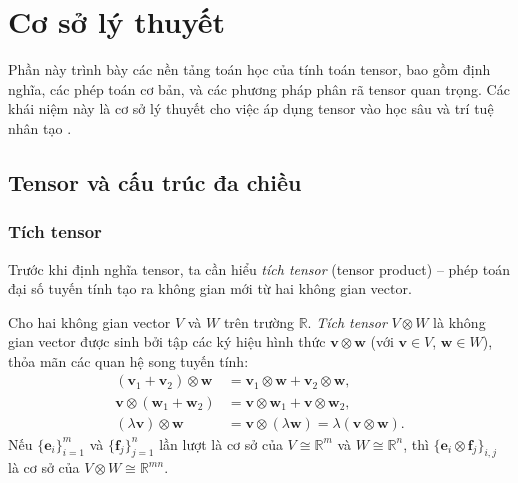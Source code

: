 \section{Cơ sở lý thuyết}

Phần này trình bày các nền tảng toán học của tính toán tensor, bao gồm định nghĩa, các phép toán cơ bản, và các phương pháp phân rã tensor quan trọng. Các khái niệm này là cơ sở lý thuyết cho việc áp dụng tensor vào học sâu và trí tuệ nhân tạo \cite{kolda2009tensor, chrysos2025tensor}.

\subsection{Tensor và cấu trúc đa chiều}

\subsubsection{Tích tensor}

Trước khi định nghĩa tensor, ta cần hiểu \textit{tích tensor} (tensor product) -- phép toán đại số tuyến tính tạo ra không gian mới từ hai không gian vector.

\begin{definition}
Cho hai không gian vector $V$ và $W$ trên trường $\mathbb{R}$. \textit{Tích tensor} $V \otimes W$ là không gian vector được sinh bởi tập các ký hiệu hình thức $\mathbf{v} \otimes \mathbf{w}$ (với $\mathbf{v} \in V$, $\mathbf{w} \in W$), thỏa mãn các quan hệ song tuyến tính:
\begin{align}
    (\mathbf{v}_1 + \mathbf{v}_2) \otimes \mathbf{w} &= \mathbf{v}_1 \otimes \mathbf{w} + \mathbf{v}_2 \otimes \mathbf{w}, \\
    \mathbf{v} \otimes (\mathbf{w}_1 + \mathbf{w}_2) &= \mathbf{v} \otimes \mathbf{w}_1 + \mathbf{v} \otimes \mathbf{w}_2, \\
    (\lambda \mathbf{v}) \otimes \mathbf{w} &= \mathbf{v} \otimes (\lambda \mathbf{w}) = \lambda(\mathbf{v} \otimes \mathbf{w}).
\end{align}
Nếu $\{\mathbf{e}_i\}_{i=1}^m$ và $\{\mathbf{f}_j\}_{j=1}^n$ lần lượt là cơ sở của $V \cong \mathbb{R}^m$ và $W \cong \mathbb{R}^n$, thì $\{\mathbf{e}_i \otimes \mathbf{f}_j\}_{i,j}$ là cơ sở của $V \otimes W \cong \mathbb{R}^{mn}$.
\end{definition}

